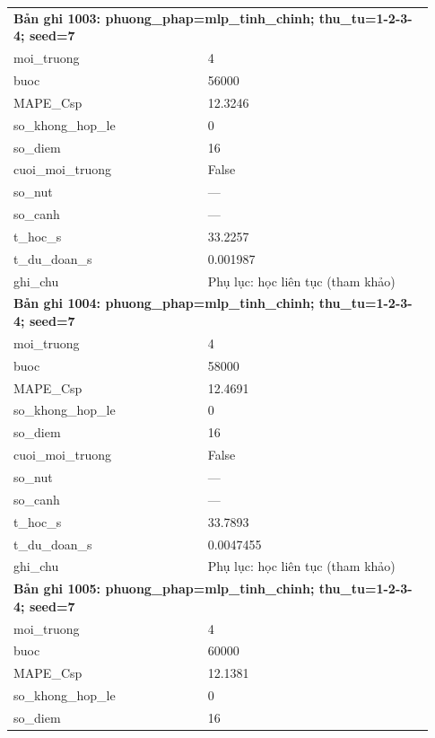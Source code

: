 \begin{longtable}{p{0.43\linewidth}p{0.50\linewidth}}
\midrule
\multicolumn{2}{p{0.95\linewidth}}{\textbf{Bản ghi 1003: phuong\_phap=mlp\_tinh\_chinh; thu\_tu=1-2-3-4; seed=7}} \\
moi\_\allowbreak truong & 4 \\
buoc & 56000 \\
MAPE\_\allowbreak Csp & 12.3246 \\
so\_\allowbreak khong\_\allowbreak hop\_\allowbreak le & 0 \\
so\_\allowbreak diem & 16 \\
cuoi\_\allowbreak moi\_\allowbreak truong & False \\
so\_\allowbreak nut & — \\
so\_\allowbreak canh & — \\
t\_\allowbreak hoc\_\allowbreak s & 33.2257 \\
t\_\allowbreak du\_\allowbreak doan\_\allowbreak s & 0.001987 \\
ghi\_\allowbreak chu & Phụ lục: học liên tục (tham khảo) \\
\midrule
\multicolumn{2}{p{0.95\linewidth}}{\textbf{Bản ghi 1004: phuong\_phap=mlp\_tinh\_chinh; thu\_tu=1-2-3-4; seed=7}} \\
moi\_\allowbreak truong & 4 \\
buoc & 58000 \\
MAPE\_\allowbreak Csp & 12.4691 \\
so\_\allowbreak khong\_\allowbreak hop\_\allowbreak le & 0 \\
so\_\allowbreak diem & 16 \\
cuoi\_\allowbreak moi\_\allowbreak truong & False \\
so\_\allowbreak nut & — \\
so\_\allowbreak canh & — \\
t\_\allowbreak hoc\_\allowbreak s & 33.7893 \\
t\_\allowbreak du\_\allowbreak doan\_\allowbreak s & 0.0047455 \\
ghi\_\allowbreak chu & Phụ lục: học liên tục (tham khảo) \\
\midrule
\multicolumn{2}{p{0.95\linewidth}}{\textbf{Bản ghi 1005: phuong\_phap=mlp\_tinh\_chinh; thu\_tu=1-2-3-4; seed=7}} \\
moi\_\allowbreak truong & 4 \\
buoc & 60000 \\
MAPE\_\allowbreak Csp & 12.1381 \\
so\_\allowbreak khong\_\allowbreak hop\_\allowbreak le & 0 \\
so\_\allowbreak diem & 16 \\

\end{longtable}
